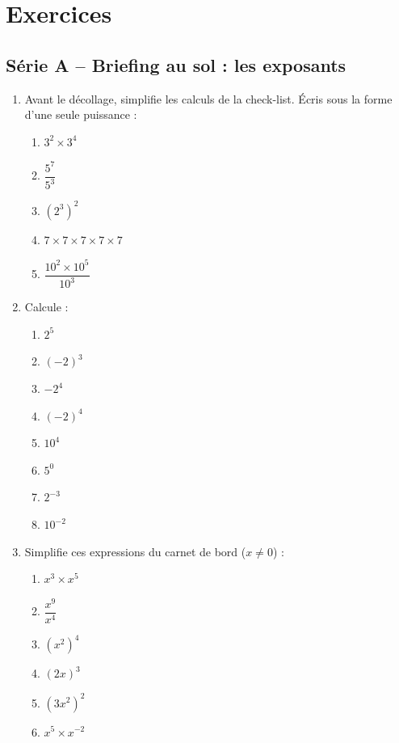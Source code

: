 \documentclass[../main.tex]{subfiles}
\begin{document}
\newpage
\section{Exercices}

\subsection{Série A -- Briefing au sol : les exposants}

\begin{enumerate}[label=\textbf{\arabic*.}]

\item Avant le décollage, simplifie les calculs de la check-list. Écris sous la forme d'une seule puissance :
\begin{enumerate}[label=\alph*)]
  \item $3^2 \times 3^4$ \qquad
  \item $\dfrac{5^7}{5^3}$ \qquad
  \item $(2^3)^2$ \qquad
  \item $7\times7\times7\times7\times7$ \qquad
  \item $\dfrac{10^2 \times 10^5}{10^3}$
\end{enumerate}

\item Calcule :
\begin{enumerate}[label=\alph*)]
  \item $2^5$ \qquad
  \item $(-2)^3$ \qquad
  \item $-2^4$ \qquad
  \item $(-2)^4$ \qquad
  \item $10^4$ \qquad
  \item $5^0$ \qquad
  \item $2^{-3}$ \qquad
  \item $10^{-2}$
\end{enumerate}

\item Simplifie ces expressions du carnet de bord ($x \neq 0$) :
\begin{enumerate}[label=\alph*)]
  \item $x^3 \times x^5$ \qquad
  \item $\dfrac{x^9}{x^4}$ \qquad
  \item $(x^2)^4$ \qquad
  \item $(2x)^3$ \qquad
  \item $(3x^2)^2$ \qquad
  \item $x^5 \times x^{-2}$
\end{enumerate}


\end{enumerate}
\end{document}
